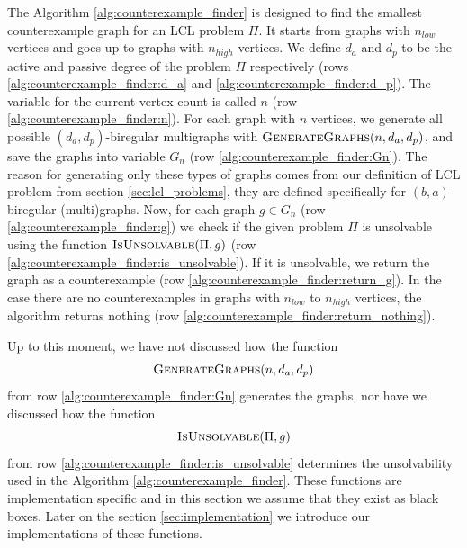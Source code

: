 The Algorithm \ref{alg:counterexample_finder} is designed to find the smallest counterexample graph for an LCL problem $\Pi$.
It starts from graphs with $n_{low}$ vertices and goes up to graphs with $n_{high}$ vertices.
We define $d_a$ and $d_p$ to be the active and passive degree of the problem $\Pi$ respectively (rows \ref{alg:counterexample_finder:d_a} and \ref{alg:counterexample_finder:d_p}).
The variable for the current vertex count is called $n$ (row \ref{alg:counterexample_finder:n}).
For each graph with $n$ vertices, we generate all possible $(d_a, d_p)$-biregular multigraphs with $\textsc{GenerateGraphs}(n, d_a, d_p)$, and save the graphs into variable $G_n$ (row \ref{alg:counterexample_finder:Gn}).
The reason for generating only these types of graphs comes from our definition of LCL problem from section \ref{sec:lcl_problems}, they are defined specifically for $(b,a)$-biregular (multi)graphs.
Now, for each graph $g \in G_n$ (row \ref{alg:counterexample_finder:g}) we check if the given problem $\Pi$ is unsolvable using the function $\textsc{IsUnsolvable}(\Pi, g)$ (row \ref{alg:counterexample_finder:is_unsolvable}).
If it is unsolvable, we return the graph as a counterexample (row \ref{alg:counterexample_finder:return_g}).
In the case there are no counterexamples in graphs with $n_{low}$ to $n_{high}$ vertices, the algorithm returns nothing (row \ref{alg:counterexample_finder:return_nothing}).

Up to this moment, we have not discussed how the function $$\textsc{GenerateGraphs}(n, d_a, d_p)$$ from row \ref{alg:counterexample_finder:Gn} generates the graphs, nor have we discussed how the function $$\textsc{IsUnsolvable}(\Pi, g)$$ from row \ref{alg:counterexample_finder:is_unsolvable} determines the unsolvability used in the Algorithm \ref{alg:counterexample_finder}.
These functions are implementation specific and in this section we assume that they exist as black boxes.
Later on the section \ref{sec:implementation} we introduce our implementations of these functions.



